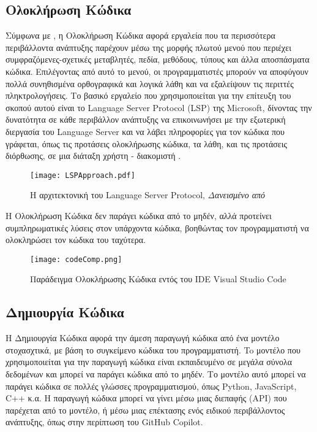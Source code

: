 \subsection*{Ολοκλήρωση Κώδικα}
Σύμφωνα με \textlatin{\citeauthor{Omar2012}} \cite{Omar2012}, η Ολοκλήρωση Κώδικα αφορά εργαλεία που τα περισσότερα περιβάλλοντα ανάπτυξης παρέχουν μέσω της μορφής πλωτού μενού που περιέχει συμφραζόμενες-σχετικές μεταβλητές, πεδία, μεθόδους, τύπους και άλλα αποσπάσματα κώδικα. Επιλέγοντας από αυτό το μενού, οι προγραμματιστές μπορούν να αποφύγουν πολλά συνηθισμένα ορθογραφικά και λογικά λάθη και να εξαλείψουν τις περιττές πληκτρολογήσεις. Το βασικό εργαλείο που χρησιμοποιείται για την επίτευξη του σκοπού αυτού είναι το \textlatin{Language Server Protocol (LSP)} της \textlatin{Microsoft}, δίνοντας την δυνατότητα σε κάθε περιβάλλον ανάπτυξης να επικοινωνήσει με την εξωτερική διεργασία του \textlatin{Language Server} και να λάβει πληροφορίες για τον κώδικα που γράφεται, όπως τις προτάσεις ολοκλήρωσης κώδικα, τα λάθη, και τις προτάσεις διόρθωσης, σε μια διάταξη χρήστη - διακομιστή \cite{Rask2022, Bunder2019}. 

\begin{figure}[H]
  \begin{center}
    \texttt{[image: LSPApproach.pdf]}
    \label{fig:LSP_architecture}
    \caption{Η αρχιτεκτονική του \textlatin{Language Server Protocol}, \textit{Δανεισμένο από \cite{Rodriguez-Echeverria2018}}}
  \end{center}
\end{figure}

Η Ολοκλήρωση Κώδικα δεν παράγει κώδικα από το μηδέν, αλλά προτείνει συμπληρωματικές λύσεις στον υπάρχοντα κώδικα, βοηθώντας τον προγραμματιστή να ολοκληρώσει τον κώδικα του ταχύτερα.

\begin{figure}[H]
  \begin{center}
    \texttt{[image: codeComp.png]}
    \label{fig:codeComp}
    \caption{Παράδειγμα Ολοκλήρωσης Κώδικα εντός του \textlatin{IDE} \textlatin{Visual Studio Code}  }
  \end{center}
\end{figure}

\subsection*{Δημιουργία Κώδικα}
Η Δημιουργία Κώδικα αφορά την άμεση παραγωγή κώδικα από ένα μοντέλο στοχασχτικά, με βάση το συγκείμενο κώδικα του προγραμματιστή. To μοντέλο που χρησιμοποιείται για την παραγωγή κώδικα είναι εκπαιδευμένο σε μεγάλα σύνολα δεδομένων και μπορεί να παράγει κώδικα από το μηδέν. Το μοντέλο αυτό μπορεί να παράγει κώδικα σε πολλές γλώσσες προγραμματισμού, όπως \textlatin{Python, JavaScript, C++} κ.α. Η παραγωγή κώδικα μπορεί να γίνει μέσω μιας διεπαφής \textlatin{(API)} που παρέχεται από το μοντέλο, ή μέσω μιας επέκτασης ενός ειδικού περιβάλλοντος ανάπτυξης, όπως στην περίπτωση του \textlatin{GitHub Copilot}. 

